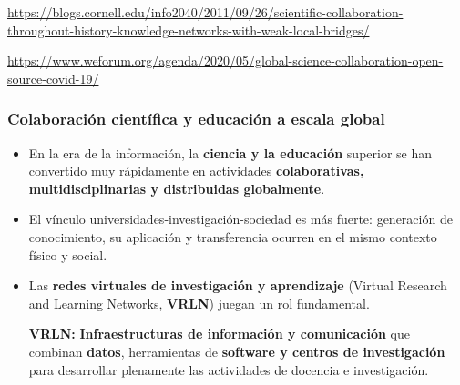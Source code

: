 \begin{frame}
{\tiny \href{https://blogs.cornell.edu/info2040/2011/09/26/scientific-collaboration-throughout-history-knowledge-networks-with-weak-local-bridges/}{\color{cyan} https://blogs.cornell.edu/info2040/2011/09/26/scientific-collaboration-throughout-history-knowledge-networks-with-weak-local-bridges/}}

{\tiny \href{https://www.weforum.org/agenda/2020/05/global-science-collaboration-open-source-covid-19/}{\color{cyan} https://www.weforum.org/agenda/2020/05/global-science-collaboration-open-source-covid-19/}}

\end{frame}


\begin{frame}[fragile]
\frametitle{Colaboración científica y educación a escala global}
 
\begin{itemize}
\item En la era de la información, la {\bf \color{LCblueInst}ciencia y la educación} superior se han convertido muy rápidamente en actividades {\bf \color{LCredInst}colaborativas, multidisciplinarias y distribuidas globalmente}.

\item El vínculo universidades-investigación-sociedad es más fuerte: generación de conocimiento, su aplicación y transferencia ocurren en el mismo contexto físico y social. 

\item Las {\bf \color{logoyellow}redes virtuales de investigación y aprendizaje} (Virtual Research and Learning Networks, {\bf \color{logobrownD}VRLN}) juegan un rol fundamental.

\vspace{0.5cm}

{\bf VRLN:} {\bf \color{logobrownD}Infraestructuras de información y comunicación} que combinan {\bf \color{LCredInst}datos}, herramientas de {\bf \color{LCblueInst}software y centros de investigación} para desarrollar plenamente las actividades de docencia e investigación.
\end{itemize}

\end{frame}

